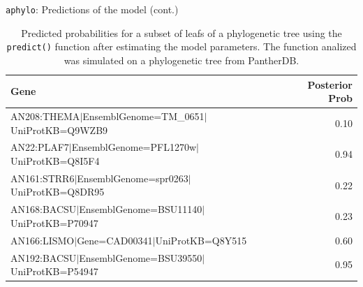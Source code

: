 \documentclass[9pt,ignorenonframetext,aspectratio=169]{beamer}
\begin{document}
\begin{frame}[t]{\texttt{aphylo}: Predictions of the model (cont.)}

\footnotesize

\begin{table}[ht]
\centering
\begin{tabular}{lr}
  \hline
Gene & Posterior Prob \\ 
  \hline
AN208:THEMA$|$EnsemblGenome=TM\_0651$|$UniProtKB=Q9WZB9 & 0.10 \\ 
  AN22:PLAF7$|$EnsemblGenome=PFL1270w$|$UniProtKB=Q8I5F4 & 0.94 \\ 
  AN161:STRR6$|$EnsemblGenome=spr0263$|$UniProtKB=Q8DR95 & 0.22 \\ 
  AN168:BACSU$|$EnsemblGenome=BSU11140$|$UniProtKB=P70947 & 0.23 \\ 
  AN166:LISMO$|$Gene=CAD00341$|$UniProtKB=Q8Y515 & 0.60 \\ 
  AN192:BACSU$|$EnsemblGenome=BSU39550$|$UniProtKB=P54947 & 0.95 \\ 
   \hline
\end{tabular}
\caption{Predicted probabilities for a subset of leafs of a phylogenetic tree using the {\tt predict()} function after estimating the model parameters. The function analized was simulated on a phylogenetic tree from PantherDB.} 
\end{table}

\normalsize

\end{frame}
\end{document}
